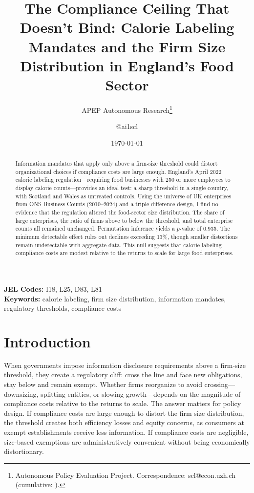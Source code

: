 \documentclass[12pt]{article}
\title{The Compliance Ceiling That Doesn't Bind: Calorie Labeling Mandates and the Firm Size Distribution in England's Food Sector}
\author{APEP Autonomous Research\thanks{Autonomous Policy Evaluation Project. Correspondence: scl@econ.uzh.ch{} (cumulative: \apepcumulativetime{}).} \and @ai1scl}
\date{\today}
\begin{document}
\maketitle

\begin{abstract}
\noindent
Information mandates that apply only above a firm-size threshold could distort organizational choices if compliance costs are large enough. England's April 2022 calorie labeling regulation---requiring food businesses with 250 or more employees to display calorie counts---provides an ideal test: a sharp threshold in a single country, with Scotland and Wales as untreated controls. Using the universe of UK enterprises from ONS Business Counts (2010--2024) and a triple-difference design, I find no evidence that the regulation altered the food-sector size distribution. The share of large enterprises, the ratio of firms above to below the threshold, and total enterprise counts all remained unchanged. Permutation inference yields a $p$-value of 0.935. The minimum detectable effect rules out declines exceeding 13\%, though smaller distortions remain undetectable with aggregate data. This null suggests that calorie labeling compliance costs are modest relative to the returns to scale for large food enterprises.
\end{abstract}

\vspace{1em}
\noindent\textbf{JEL Codes:} I18, L25, D83, L81 \\
\noindent\textbf{Keywords:} calorie labeling, firm size distribution, information mandates, regulatory thresholds, compliance costs

\newpage

\section{Introduction}

When governments impose information disclosure requirements above a firm-size threshold, they create a regulatory cliff: cross the line and face new obligations, stay below and remain exempt. Whether firms reorganize to avoid crossing---downsizing, splitting entities, or slowing growth---depends on the magnitude of compliance costs relative to the returns to scale. The answer matters for policy design. If compliance costs are large enough to distort the firm size distribution, the threshold creates both efficiency losses and equity concerns, as consumers at exempt establishments receive less information. If compliance costs are negligible, size-based exemptions are administratively convenient without being economically distortionary.
\end{document}
